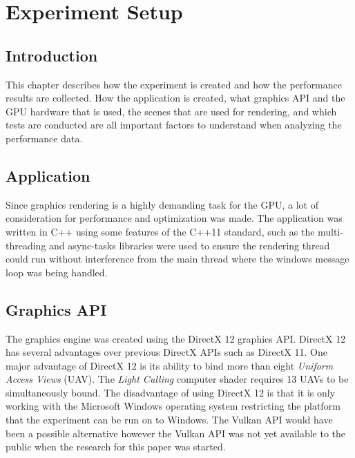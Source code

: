 
\chapter{Experiment Setup} %

\label{ch:ExperimentSetup} %

\section{Introduction}

This chapter describes how the experiment is created and how the performance results are collected. How the application is created, what graphics API and the GPU hardware that is used, the scenes that are used for rendering, and which tests are conducted are all important factors to understand when analyzing the performance data.

\section{Application}

Since graphics rendering is a highly demanding task for the GPU, a lot of consideration for performance and optimization was made. The application was written in C++ using some features of the C++11 standard, such as the multi-threading and async-tasks libraries were used to ensure the rendering thread could run without interference from the main thread where the windows message loop was being handled. 

\section{Graphics API}
\label{sec:GraphicsAPI}

The graphics engine was created using the DirectX 12 graphics API. DirectX 12 has several advantages over previous DirectX APIs such as DirectX 11. One major advantage of DirectX 12 is its ability to bind more than eight \emph{Uniform Access Views} (UAV). The \emph{Light Culling} computer shader requires 13 UAVs to be simultaneously bound. The disadvantage of using DirectX 12 is that it is only working with the Microsoft Windows operating system restricting the platform that the experiment can be run on to Windows. The Vulkan API would have been a possible alternative however the Vulkan API was not yet available to the public when the research for this paper was started.


